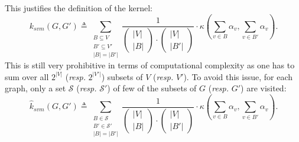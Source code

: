                 This justifies the definition of the kernel:
                \begin{equation}
                    \label{eq::svm_kernel}
                    k_{svm}(G, G') \triangleq \sum_{\substack{B\subseteq V\\B'\subseteq V'\\\vert B \vert = \vert B' \vert}} \frac{1}{
                        \begin{pmatrix}
                            \vert V \vert\\
                            \vert B \vert                            
                        \end{pmatrix} \cdot \begin{pmatrix}
                            \vert V \vert\\
                            \vert B' \vert                            
                        \end{pmatrix}
                    } \cdot \kappa\left(\sum_{v\in B} \alpha_v, \sum_{v\in B'} \alpha_v\right).
                \end{equation}
                This is still very prohibitive in terms of computational complexity as one has to sum over all $2^{\vert V \vert}$ (\textit{resp.} $2^{\vert V' \vert}$) subsets of $V$ (\textit{resp.} $V'$).
                To avoid this issue, for each graph, only a set \(\mathscr{S}\) (\textit{resp.} \(\mathscr{S}'\)) of few of the subsets of \(G\) (\textit{resp.} \(G'\)) are visited:
                \begin{equation}
                    \label{eq::svm_approximated_kernel}
                    \hat{k}_{svm}(G, G') \triangleq \sum_{\substack{B\in \mathscr{S}\\B'\in \mathscr{S}'\\\vert B \vert = \vert B' \vert}} \frac{1}{
                        \begin{pmatrix}
                            \vert V \vert\\
                            \vert B \vert                            
                        \end{pmatrix} \cdot \begin{pmatrix}
                            \vert V \vert\\
                            \vert B' \vert                            
                        \end{pmatrix}
                    } \cdot \kappa\left(\sum_{v\in B} \alpha_v, \sum_{v\in B'} \alpha_v\right).
                \end{equation}

